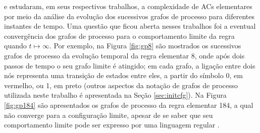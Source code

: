 \documentclass[12pt,a4paper]{article}
\begin{document}
 e 
estudaram, em seus respectivos trabalhos, a complexidade de ACs
elementares por meio da análise da evolução dos sucessivos
grafos de processo para diferentes instantes de tempo. Uma questão que ficou aberta
nesses trabalhos foi a eventual convergência dos grafos de processo para o comportamento
limite da regra quando $t \mapsto \infty$. Por exemplo, na Figura \ref{fig:gp8} são
mostrados os sucessivos grafos de processo da evolução temporal da regra elementar 8,
onde após dois passos de tempo o seu grafo limite é atingido; em cada grafo, a ligação
entre dois nós representa uma transição de estados entre eles, a partir do símbolo
0, em vermelho, ou 1, em preto (outros aspectos da notação
de grafos de processo utilizada neste trabalho é apresentada na Seção \ref{sec:initcfg}).
Na Figura \ref{fig:gp184} são apresentados os grafos de processo da regra elementar 184,
a qual não converge para a configuração limite, apesar de se saber que seu comportamento
limite pode ser expresso por uma linguagem regular .
\end{document}
